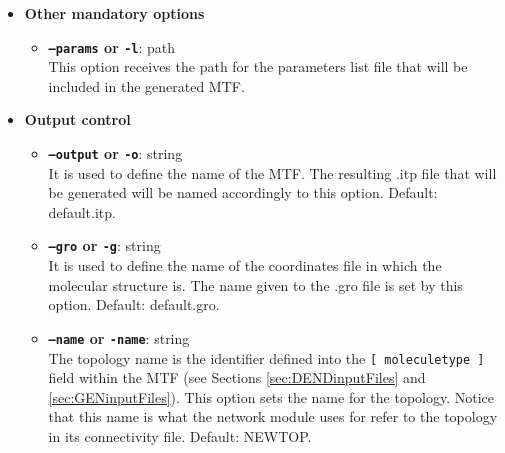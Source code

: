 \documentclass[12pt]{article}
\begin{document}
\begin{itemize}
  \item \textbf{Other mandatory options}
\begin{itemize}
  \item \textbf{\texttt{--params} or \texttt{-l}}: path\\
    This option receives the path for the parameters list file that will be included in the generated MTF.
\end{itemize}

  \item \textbf{Output control}
\begin{itemize}
  \item \textbf{\texttt{--output} or \texttt{-o}}: string\\
    It is used to define the name of the MTF. The resulting .itp file that will be generated will be named accordingly to this option. Default: default.itp.
  \item \textbf{\texttt{--gro} or \texttt{-g}}: string\\
    It is used to define the name of the coordinates file in which the molecular structure is. The name given to the .gro file is set by this option. Default: default.gro.
  \item \textbf{\texttt{--name} or \texttt{-name}}: string\\
    The topology name is the identifier defined into the \texttt{[ moleculetype ]} field within the MTF (see Sections \ref{sec:DENDinputFiles} and \ref{sec:GENinputFiles}). This option sets the name for the topology. Notice that this name is what the network module uses for refer to the topology in its connectivity file. Default: NEWTOP.
\end{itemize}


\end{itemize}
\end{document}
